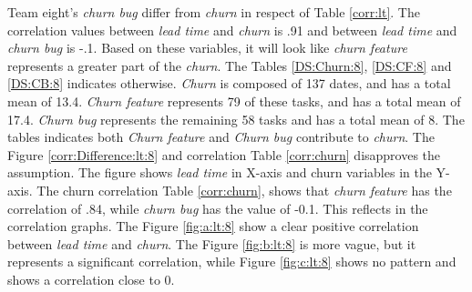 \documentclass[UKenglish]{ifimaster}  %
\begin{document}
Team eight's \textit{churn bug} differ from \textit{churn} in respect of Table  \ref{corr:lt}. The correlation values between \textit{lead time} and \textit{churn} is .91 and between \textit{lead time} and \textit{churn bug} is  -.1. Based on these variables, it will look like \textit{churn feature} represents a greater part of the \textit{churn}. The Tables \ref{DS:Churn:8}, \ref{DS:CF:8} and \ref{DS:CB:8} indicates otherwise. \textit{Churn} is composed of 137 dates, and has a total mean of 13.4. \textit{Churn feature} represents 79 of these tasks, and has a total mean of 17.4. \textit{Churn bug} represents the remaining 58 tasks and has a total mean of 8.  The tables indicates both \textit{Churn feature} and \textit{Churn bug} contribute to \textit{churn}. The Figure \ref{corr:Difference:lt:8} and correlation Table \ref{corr:churn} disapproves the assumption. The figure shows \textit{lead time} in X-axis and churn variables in the Y-axis. The churn correlation Table \ref{corr:churn}, shows that \textit{churn feature} has the correlation of .84, while \textit{churn bug} has the value of -0.1. This reflects in the correlation graphs. The Figure \ref{fig:a:lt:8} show a clear positive correlation between  \textit{lead time} and  \textit{churn}. The Figure \ref{fig:b:lt:8} is more vague, but it represents a significant correlation, while Figure \ref{fig:c:lt:8} shows no pattern and shows a correlation close to 0.  
\end{document}
